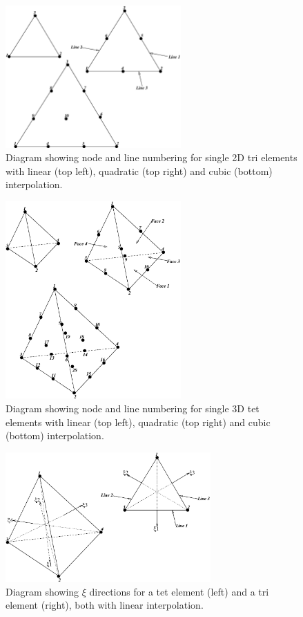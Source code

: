 \begin{figure}
\centering
      \includegraphics[width=0.6\textwidth]{figs/Modules/tri_elements.eps}
\caption{Diagram showing node and line numbering for single 2D tri elements 
with linear (top left), quadratic (top right) and cubic (bottom) 
interpolation.}
\label{tri_elements}
\end{figure}

\begin{figure}
\centering
      \includegraphics[width=0.6\textwidth]{figs/Modules/tet_elements.eps}
\caption{Diagram showing node and line numbering for single 3D tet elements 
with linear (top left), quadratic (top right) and cubic (bottom) 
interpolation.}
\label{tet_elements}
\end{figure}

\begin{figure}
\centering
      \includegraphics[width=0.7\textwidth]{figs/Modules/tet_normals.eps}
\caption{Diagram showing $\xi$ directions for a tet element (left) and  
a tri element (right), both with linear interpolation.}
\label{tet_normals}
\end{figure}


